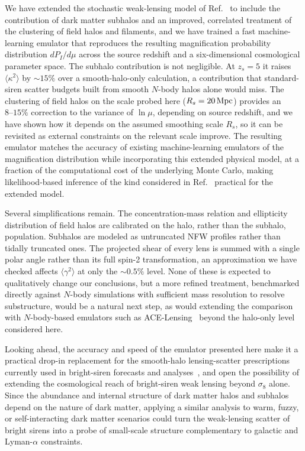 \documentclass[aps,prd,10pt,nofootinbib,twocolumn,superscriptaddress,floatfix,notitlepage]{revtex4-1}
\newcommand{\B}[1]{{\color{blue} #1}}
\begin{document}
\B{We have extended the stochastic weak-lensing model of Ref.~\cite{Vaskonen:2026ubd} to include the contribution of dark matter subhalos and an improved, correlated treatment of the clustering of field halos and filaments, and we have trained a fast machine-learning emulator that reproduces the resulting magnification probability distribution $dP_I/d\mu$ across the source redshift and a six-dimensional cosmological parameter space. The subhalo contribution is not negligible. At $z_s=5$ it raises $\langle\kappa^2\rangle$ by $\sim15\%$ over a smooth-halo-only calculation, a contribution that standard-siren scatter budgets built from smooth $N$-body halos alone would miss. The clustering of field halos on the scale probed here ($R_s = 20\,{\rm Mpc}$) provides an $8\text{--}15\%$ correction to the variance of $\ln\mu$, depending on source redshift, and we have shown how it depends on the assumed smoothing scale $R_s$, so it can be revisited as external constraints on the relevant scale improve. The resulting emulator matches the accuracy of existing machine-learning emulators of the magnification distribution while incorporating this extended physical model, at a fraction of the computational cost of the underlying Monte Carlo, making likelihood-based inference of the kind considered in Ref.~\cite{Vaskonen:2026ubd} practical for the extended model.}

\B{Several simplifications remain. The concentration-mass relation and ellipticity distribution of field halos are calibrated on the halo, rather than the subhalo, population. Subhalos are modeled as untruncated NFW profiles rather than tidally truncated ones. The projected shear of every lens is summed with a single polar angle rather than its full spin-2 transformation, an approximation we have checked affects $\langle\gamma^2\rangle$ at only the $\sim0.5\%$ level. None of these is expected to qualitatively change our conclusions, but a more refined treatment, benchmarked directly against $N$-body simulations with sufficient mass resolution to resolve substructure, would be a natural next step, as would extending the comparison with $N$-body-based emulators such as ACE-Lensing~\cite{Turker:2025rdt} beyond the halo-only level considered here.}

\B{Looking ahead, the accuracy and speed of the emulator presented here make it a practical drop-in replacement for the smooth-halo lensing-scatter prescriptions currently used in bright-siren forecasts and analyses~\cite{CITE-Mpetha}, and open the possibility of extending the cosmological reach of bright-siren weak lensing beyond $\sigma_8$ alone. Since the abundance and internal structure of dark matter halos and subhalos depend on the nature of dark matter, applying a similar analysis to warm, fuzzy, or self-interacting dark matter scenarios could turn the weak-lensing scatter of bright sirens into a probe of small-scale structure complementary to galactic and Lyman-$\alpha$ constraints.}
\end{document}
